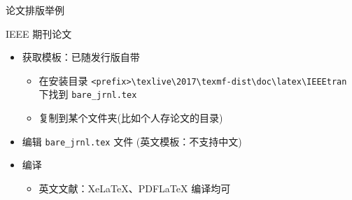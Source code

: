 \begin{frame}[fragile]{论文排版举例}
  \begin{exampleblock}{IEEE 期刊论文}
    \begin{itemize}
      \item 获取模板：已随发行版自带
        \begin{itemize}
          \item 在安装目录 \verb|<prefix>\texlive\2017\texmf-dist\doc\latex\IEEEtran|
            下找到 \verb|bare_jrnl.tex|
          \item 复制到某个文件夹(比如个人存论文的目录)
        \end{itemize}
      \item 编辑 \verb|bare_jrnl.tex| 文件 (英文模板：不支持中文)
      \item 编译
        \begin{itemize}
          \item 英文文献：XeLaTeX、PDFLaTeX 编译均可
        \end{itemize}
    \end{itemize}
  \end{exampleblock}
\end{frame}


